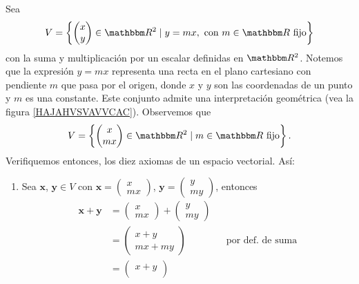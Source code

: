 \begin{examplebox}{}{}
    Sea
    $$V = \left\{ \begin{pmatrix}
        x \\
        y
    \end{pmatrix} \in \RR[2] \mid y = mx, \text{ con } m \in \RR \text{ fijo} \right\}$$
    con la suma y multiplicación por un escalar definidas en $\RR[2]$. Notemos que la expresión $y = mx$ representa una recta en el plano cartesiano con pendiente $m$ que pasa por el origen, donde $x$ y $y$ son las coordenadas de un punto y $m$ es una constante. Este conjunto admite una interpretación geométrica (vea la figura \ref{HAJAHVSVAVVCAC}). Observemos que
    $$V = \left\{ \begin{pmatrix}
        x \\
        mx
    \end{pmatrix} \in \RR[2] \mid m \in \RR \text{ fijo} \right\}.$$
    Verifiquemos entonces, los diez axiomas de un espacio vectorial. Así:
    \begin{enumerate}[label=\roman*), topsep=6pt, itemsep=0pt]
        \item Sea $\mathbf{x}$, $\mathbf{y} \in V$ con $\mathbf{x} = \begin{pmatrix}
            x \\
            mx
        \end{pmatrix}$, $\mathbf{y} = \begin{pmatrix}
            y \\
            my
        \end{pmatrix}$, entonces
        \begin{align*}
            \mathbf{x} + \mathbf{y} & = \begin{pmatrix}
                x \\
                mx
            \end{pmatrix} + \begin{pmatrix}
                y \\
                my
            \end{pmatrix} \\
            & = \begin{pmatrix}
                x + y \\
                mx + my
            \end{pmatrix} && \text{por def. de suma} \\
            & = \begin{pmatrix}
                x + y \\

\end{pmatrix}
\end{align*}
\end{enumerate}
\end{examplebox}
